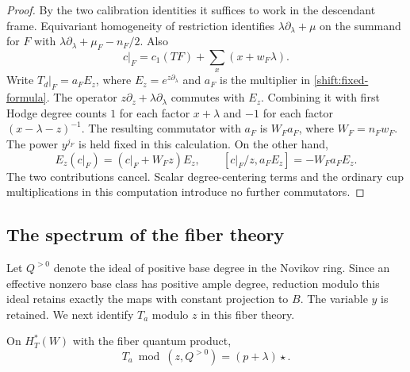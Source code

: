 \begin{proof}
By the two calibration identities it suffices to work in the
descendant frame.  Equivariant homogeneity of restriction identifies
$\lambda\partial_\lambda+\mu$ on the summand for $F$ with
$\lambda\partial_\lambda+\mu_F-n_F/2$.  Also
\[
 c|_F=c_1(TF)+\sum_x(x+w_F\lambda).
\]
Write $T_d|_F=a_F E_z$, where $E_z=e^{z\partial_\lambda}$ and
$a_F$ is the multiplier in \eqref{shift:fixed-formula}.  The operator
$z\partial_z+\lambda\partial_\lambda$ commutes with $E_z$.
Combining it with first Hodge degree counts $1$ for each factor
$x+\lambda$ and $-1$ for each factor $(x-\lambda-z)^{-1}$.
The resulting commutator with $a_F$ is $W_F a_F$, where
$W_F=n_Fw_F$.  The power $y^{j_F}$ is held fixed in this calculation.
On the other hand,
\[
 E_z(c|_F)=(c|_F+W_Fz)E_z,
 \qquad
 [c|_F/z,a_FE_z]=-W_Fa_FE_z.
\]
The two contributions cancel.  Scalar degree-centering terms and
the ordinary cup multiplications in this computation introduce no
further commutators.
\end{proof}

\subsection{The spectrum of the fiber theory}

Let $Q^{>0}$ denote the ideal of positive base degree in the Novikov
ring.  Since an effective nonzero base class has positive ample
degree, reduction modulo this ideal retains exactly the maps with
constant projection to $B$.  The variable $y$ is retained.  We next
identify $T_a$ modulo $z$ in this fiber theory.

\begin{lemma}
\label{shift:fiber-operator}
On $H_T^*(W)$ with the fiber quantum product,
\begin{equation}
               T_a\bmod(z,Q^{>0})=(p+\lambda)\star.
 \label{shift:seidel}
\end{equation}
\end{lemma}

